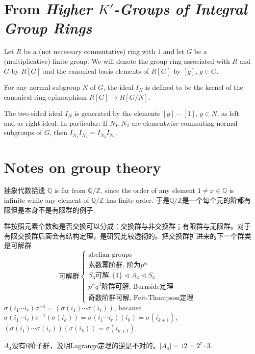 \section{From {\em Higher $K'$-Groups of Integral Group Rings }}

Let $R$ be a (not necessary commutative) ring with $1$ and let $G$ be a (multiplicative)
finite group. We will denote the group ring associated with $R$ and $G$ by $R[G]$ and
the canonical basis elements of $R[G]$ by $[g]$, $g \in G$. 
\begin{definition}
	For any normal subgroup $N$ of $G$, the ideal $I_N$ is defined to be the kernel of the canonical ring epimorphism $R[G] \longrightarrow R[G/N]$. 
\end{definition}

\begin{lemma}
	The two-sided ideal $I_N$ is generated by the elements $[g] - [1]$, $g \in N$, as
left and as right ideal. In particular: If $N_1, N_2$ are elementwise commuting normal
subgroups of $G$, then $I_{N_1} I_{N_2} = I_{N_2} I_{N_1}$. 
\end{lemma}

\section{Notes on group theory}
抽象代数拾遗
$\mathbb{Q}$ is far from $\mathbb{Q}/\mathbb{Z}$, since the order of any element $1\neq x\in \mathbb{Q}$ is infinite while any element of $\mathbb{Q}/\mathbb{Z}$ has finite order.
于是$\mathbb{Q}/\mathbb{Z}$是一个每个元的阶都有限但是本身不是有限群的例子.

群按照元素个数和是否交换可以分成：交换群与非交换群；有限群与无限群。对于有限交换群后面会有结构定理，是研究比较透彻的。把交换群扩进来的下一个群类是可解群
\[
\text{可解群}\begin{cases}
	\text{abelian groups}\\
	\text{素数幂阶群, 阶为}p^\alpha\\
	S_3\text{可解}, \{1\}\lhd A_3\lhd S_3\\
	p^\alpha q^\beta\text{阶群可解, Burnside定理}\\
	\text{奇数阶群可解, Feit-Thompson定理}
\end{cases}
\]
$\sigma (i_1 \cdots i_r) \sigma^{-1}=(\sigma(i_1) \cdots \sigma(i_r))$, because $\sigma (i_1 \cdots i_r) \sigma^{-1}(\sigma(i_k))=\sigma(i_1\cdots i_r)(i_k)=\sigma (i_{k+1})$, $(\sigma(i_1) \cdots \sigma(i_r))(\sigma(i_k))=\sigma (i_{k+1})$.

$A_4$没有$6$阶子群，说明Lagrange定理的逆是不对的。$|A_4|=12=2^2\cdot 3$.

